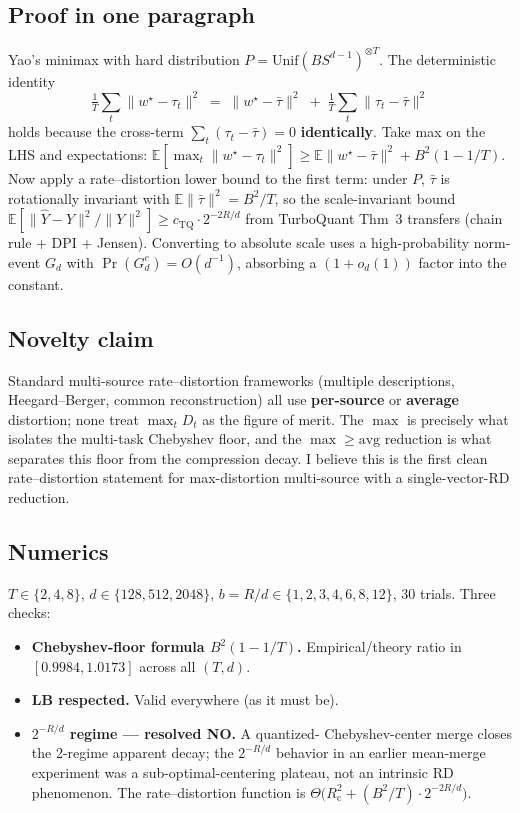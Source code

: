 \documentclass[11pt]{article}
\newcommand{\E}{\mathbb{E}}
\newcommand{\cheb}{R_{\mathrm{c}}}
\begin{document}
\subsection*{Proof in one paragraph}

Yao's minimax with hard distribution $P = \mathrm{Unif}(B S^{d-1})^
{\otimes T}$. The deterministic identity
\[
  \tfrac{1}{T}\sum_t \|w^\star - \tau_t\|^2
  \;=\; \|w^\star - \bar\tau\|^2
  \;+\; \tfrac{1}{T}\sum_t \|\tau_t - \bar\tau\|^2
\]
holds because the cross-term $\sum_t(\tau_t - \bar\tau) = 0$
\textbf{identically}. Take max on the LHS and expectations:
$\E[\max_t \|w^\star - \tau_t\|^2] \geq \E\|w^\star - \bar\tau\|^2
+ B^2(1 - 1/T)$. Now apply a rate--distortion lower bound to the
first term: under $P$, $\bar\tau$ is rotationally invariant with
$\E\|\bar\tau\|^2 = B^2/T$, so the scale-invariant bound
$\E[\|\hat Y - Y\|^2 / \|Y\|^2] \geq c_{\mathrm{TQ}} \cdot 2^{-2R/d}$
from TurboQuant Thm~3 transfers (chain rule + DPI + Jensen).
Converting to absolute scale uses a high-probability norm-event
$G_d$ with $\Pr(G_d^c) = O(d^{-1})$, absorbing a $(1 + o_d(1))$
factor into the constant.

\subsection*{Novelty claim}

Standard multi-source rate--distortion frameworks (multiple
descriptions, Heegard--Berger, common reconstruction) all use
\textbf{per-source} or \textbf{average} distortion; none treat
$\max_t D_t$ as the figure of merit. The $\max$ is precisely what
isolates the multi-task Chebyshev floor, and the $\max\geq\mathrm{avg}$
reduction is what separates this floor from the compression decay.
I believe this is the first clean rate--distortion statement for
max-distortion multi-source with a single-vector-RD reduction.

\subsection*{Numerics}

$T \in \{2, 4, 8\}$, $d \in \{128, 512, 2048\}$, $b = R/d \in \{1,
2, 3, 4, 6, 8, 12\}$, 30 trials. Three checks:
\begin{itemize}[leftmargin=1.4em,itemsep=0.15em]
  \item \textbf{Chebyshev-floor formula $B^2(1 - 1/T)$.}
  Empirical/theory ratio in $[0.9984, 1.0173]$ across all $(T, d)$.
  \item \textbf{LB respected.} Valid everywhere (as it must be).
  \item \textbf{$2^{-R/d}$ regime --- resolved NO.} A quantized-
  Chebyshev-center merge closes the 2-regime apparent decay; the
  $2^{-R/d}$ behavior in an earlier mean-merge experiment was a
  sub-optimal-centering plateau, not an intrinsic RD phenomenon. The
  rate--distortion function is $\Theta\bigl(\cheb^2 + (B^2/T)
  \cdot 2^{-2R/d}\bigr)$.
\end{itemize}
\end{document}
